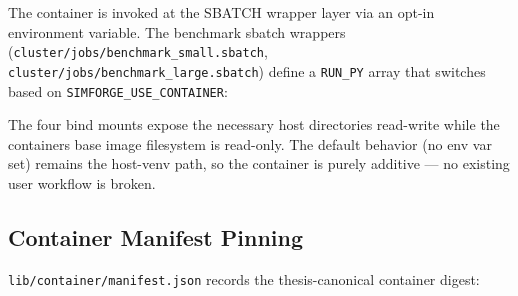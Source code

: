 The container is invoked at the SBATCH wrapper layer via an opt-in
environment variable. The benchmark sbatch wrappers
(\texttt{cluster/jobs/benchmark\_small.sbatch},
\texttt{cluster/jobs/benchmark\_large.sbatch}) define a \texttt{RUN\_PY}
array that switches based on \texttt{SIMFORGE\_USE\_CONTAINER}:

\begin{Shaded}
\begin{Highlighting}[]
 \KeywordTok{[[} \OperatorTok{:{-}}\VariableTok{\}} \OtherTok{==}  \KeywordTok{]];} 
    \OperatorTok{=}\VariableTok{(}
\VariableTok{)}
    \OperatorTok{=}\VariableTok{(}\VariableTok{)}  
\OperatorTok{[@]}\VariableTok{\}} 
\end{Highlighting}
\end{Shaded}

The four bind mounts expose the necessary host directories read-write
while the container\textquotesingle s base image filesystem is
read-only. The default behavior (no env var set) remains the host-venv
path, so the container is purely additive --- no existing user workflow
is broken.

\subsection{Container Manifest
Pinning}\label{3115-container-manifest-pinning}

\texttt{lib/container/manifest.json} records the thesis-canonical
container digest:


